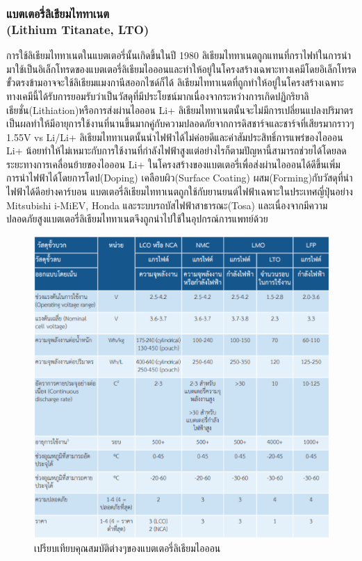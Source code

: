 \subsubsection*{แบตเตอรี่ลิเธียมไททาเนต\\ (Lithium Titanate, LTO)}
	การใช้ลิเธียมไททาเนตในแบตเตอรี่นั้นเกิดขึ้นในปี 1980 ลิเธียมไททาเนตถูกแทนที่กราไฟท์ในการนำมาใช้เป็นอิเล็กโทรดของแบตเตอรี่ลิเธียมไอออนและทำให้อยู่ในโครงสร้างเฉพาะทางเคมีโดยอิเล็กโทรดขั้วตรงข้ามอาจจะใช้ลิเธียมแมงกานีสออกไซด์ก็ได้ ลิเธียมไททาเนตที่ถูกทำให้อยู่ในโครงสร้างเฉพาะทางเคมีนี้ได้รับการยอมรับว่าเป็นวัสดุที่มีประโยชน์มากเนื่องจากระหว่างการเกิดปฏิกริยาลิเธียชั่น(Lithiation)หรือการส่งผ่านไอออน Li+ ลิเธียมไททาเนตนั้นจะไม่มีการเปลี่ยนแปลงปริมาตรเป็นผลทำให้มีอายุการใช้งานที่นานขึ้นมากคู่กับความปลอดภัยจากการดิสชาร์จและชาร์จที่เสียรมากราวๆ 1.55V vs Li/Li+ ลิเธียมไททาเนตนั้นนำไฟฟ้าได้ไม่ค่อยดีและค่าสัมประสิทธิ์การแพร่ของไอออน Li+ น้อยทำให้ไม่เหมาะกับการใช้งานที่กำลังไฟฟ้าสูงแต่อย่างไรก็ตามปัญหานี้สามารถช่วยได้โดยลดระยะทางการเคลื่อนย้ายของไอออน Li+ ในโครงสร้างของแบตเตอรี่เพื่อส่งผ่านไอออนได้ดีขึ้นเพิ่มการนำไฟฟ้าได้โดยการโดป(Doping) เคลือบผิว(Surface Coating) ผสม(Forming)กับวัสดุที่นำไฟฟ้าได้ดีอย่างคาร์บอน
	\newline แบตเตอรี่ลิเธียมไททาเนตถูกใช้กับยานยนต์ไฟฟ้าเฉพาะในประเทศญี่ปุ่นอย่าง Mitsubishi i-MiEV, Honda และระบบรถบัสไฟฟ้าสาธารณะ(Tosa) และเนื่องจากมีความปลอดภัยสูงแบตเตอรี่ลิเธียมไททาเนตจึงถูกนำไปใช้ในอุปกรณ์การแพทย์ด้วย
\begin{center}
	\begin{figure}[H]
		\includegraphics[width=1\linewidth]{Chapters/img/Compare_Spec_Batteries.png}
			\centering
			\captionsetup{justification=centering,margin=2cm}
			\caption{เปรียบเทียบคุณสมบัติต่างๆของแบตเตอรี่ลิเธียมไอออน}
	\end{figure}
\end{center}
